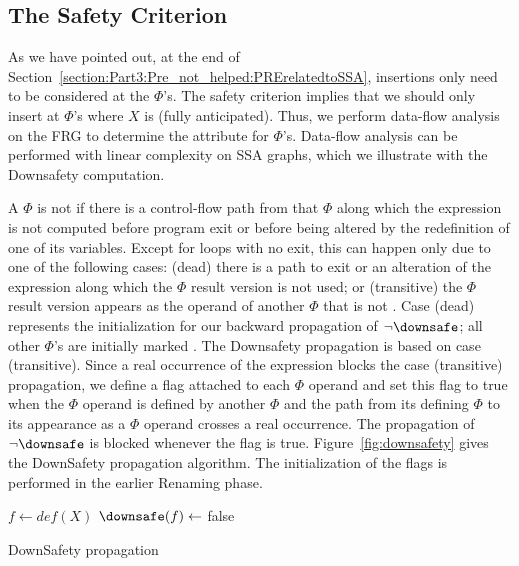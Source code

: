 \subsection{The Safety Criterion}

As we have pointed out, at the end of Section~\ref{section:Part3:Pre_not_helped:PRErelatedtoSSA}, insertions only need to be considered at the $\Phi$'s. 
The safety criterion implies that we should only insert at $\Phi$'s where $X$ is \downsafe (fully anticipated). 
Thus, we perform data-flow analysis on the FRG to determine the \downsafe attribute for $\Phi$'s. 
Data-flow analysis can be performed with linear complexity on SSA graphs, which we illustrate with the Downsafety computation.

A $\Phi$ is not \downsafe{} if there is a control-flow path from that $\Phi$ along which the expression is not computed before program exit or before being altered by the redefinition of one of its variables. 
Except for loops with no exit, this can happen only due to one of the following cases: 
(dead) there is a path to exit or an alteration of the expression along which the $\Phi$ result version is not used; 
or (transitive) the $\Phi$ result version appears as the operand of another $\Phi$ that is not \downsafe. 
Case (dead) represents the initialization for our backward propagation of $\neg \downsafe$; 
all other $\Phi$'s are initially marked \downsafe. 
The Downsafety propagation is based on case (transitive). 
Since a real occurrence of the expression blocks the case (transitive) propagation, we define a \hasrealuse flag attached to each $\Phi$ operand and set this flag to true when the $\Phi$ operand is defined by another $\Phi$ and the path from its defining $\Phi$ to its appearance as a $\Phi$ operand crosses a real occurrence. 
The propagation of $\neg \downsafe$ is blocked whenever the \hasrealuse flag is true. 
Figure~\ref{fig:downsafety} gives the DownSafety propagation algorithm. 
The initialization of the \hasrealuse flags is performed in the earlier Renaming phase.

\begin{algorithm}
  \LinesNumbered
{
}
\vspace{1em}
       {
  $f \gets def(X)$\;
  $\downsafe(f) \leftarrow$ false\;
}

\caption{DownSafety propagation}
\label{fig:downsafety}
\end{algorithm}

